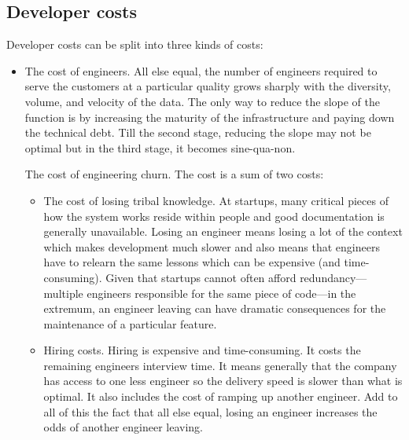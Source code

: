 \documentclass[12pt, letterpaper]{article}
\begin{document}
\subsection{Developer costs}

Developer costs can be split into three kinds of costs:
\begin{itemize}
    \item The cost of engineers. All else equal, the number of engineers required to serve the customers at a particular quality grows sharply with the diversity, volume, and velocity of the data. The only way to reduce the slope of the function is by increasing the maturity of the infrastructure and paying down the technical debt. Till the second stage, reducing the slope may not be optimal but in the third stage, it becomes sine-qua-non.

The cost of engineering churn. The cost is a sum of two costs:
\begin{itemize}
    \item The cost of losing tribal knowledge. At startups, many critical pieces of how the system works reside within people and good documentation is generally unavailable. Losing an engineer means losing a lot of the context which makes development much slower and also means that engineers have to relearn the same lessons which can be expensive (and time-consuming). Given that startups cannot often afford redundancy—multiple engineers responsible for the same piece of code—in the extremum, an engineer leaving can have dramatic consequences for the maintenance of a particular feature. 

    \item Hiring costs. Hiring is expensive and time-consuming. It costs the remaining engineers interview time. It means generally that the company has access to one less engineer so the delivery speed is slower than what is optimal. It also includes the cost of ramping up another engineer.  Add to all of this the fact that all else equal, losing an engineer increases the odds of another engineer leaving. 
\end{itemize}


\end{itemize}
\end{document}
